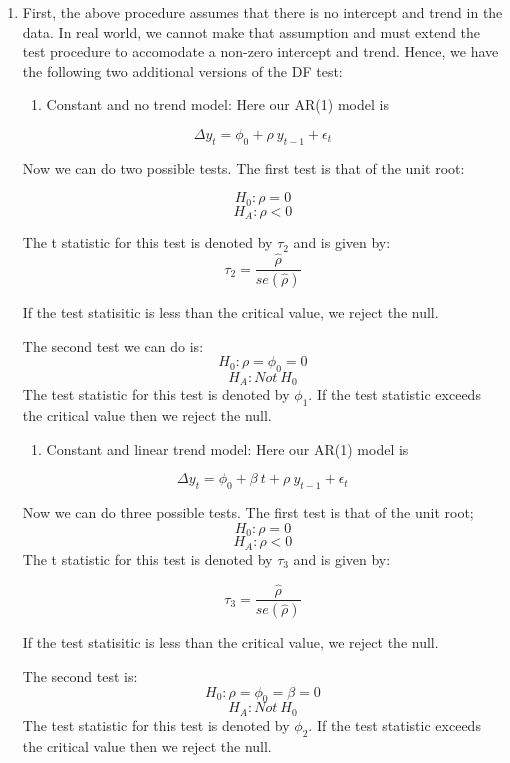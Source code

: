 \documentclass[]{book}
\providecommand{\tightlist}{%
  \setlength{\itemsep}{0pt}\setlength{\parskip}{0pt}}
\theoremstyle{definition}
\theoremstyle{definition}
\theoremstyle{definition}
\theoremstyle{remark}
\begin{document}
\begin{enumerate}
\def\labelenumi{\arabic{enumi}.}
\item
  First, the above procedure assumes that there is no intercept and trend in the data. In real world, we cannot make that assumption and must extend the test procedure to accomodate a non-zero intercept and trend. Hence, we have the following two additional versions of the DF test:

  \begin{enumerate}
  \def\labelenumii{\roman{enumii}.}
  \tightlist
  \item
    Constant and no trend model: Here our AR(1) model is
  \end{enumerate}

  \[\Delta y_t= \phi_0 + \rho \ y_{t-1}+\epsilon_t \]

  Now we can do two possible tests. The first test is that of the unit root:

  \[H_0: \rho=0 \]
  \[H_A: \rho<0\]

  The t statistic for this test is denoted by \(\tau_2\) and is given by:
  \[\tau_2 =\frac{\hat{\rho}}{se(\hat{\rho})}\]

  If the test statisitic is less than the critical value, we reject the null.

  The second test we can do is:
  \[H_0: \rho=\phi_0=0 \]
  \[H_A: Not \ H_0\]
  The test statistic for this test is denoted by \(\phi_1\). If the test statistic exceeds the critical value then we reject the null.

  \begin{enumerate}
  \def\labelenumii{\roman{enumii}.}
  \setcounter{enumii}{1}
  \tightlist
  \item
    Constant and linear trend model: Here our AR(1) model is
  \end{enumerate}

  \[\Delta y_t= \phi_0 + \beta \ t+ \rho \ y_{t-1}+\epsilon_t \]

  Now we can do three possible tests. The first test is that of the unit root;
  \[H_0: \rho=0 \]
  \[H_A: \rho<0\]
  The t statistic for this test is denoted by \(\tau_3\) and is given by:

  \[\tau_3 =\frac{\hat{\rho}}{se(\hat{\rho})}\]

  If the test statisitic is less than the critical value, we reject the null.

  The second test is:
  \[H_0: \rho=\phi_0=\beta=0 \]
  \[H_A: Not \ H_0\]
  The test statistic for this test is denoted by \(\phi_2\). If the test statistic exceeds the critical value then we reject the null.


\end{enumerate}
\end{document}
